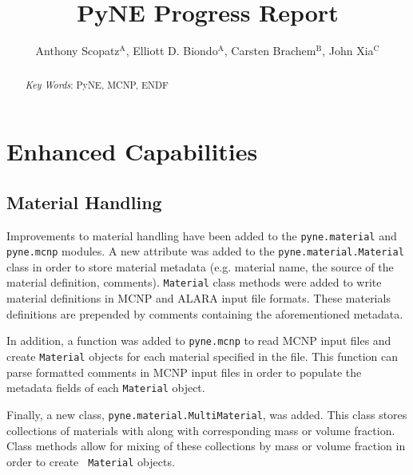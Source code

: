 \documentclass{ansconf}
\newcommand{\superscript}[1]{\ensuremath{^{\textrm{#1}}}}
\begin{document}
\title{PyNE Progress Report}

\author{Anthony Scopatz\superscript{A}, Elliott D. Biondo\superscript{A}, 
        Carsten Brachem\superscript{B}, John Xia\superscript{C}}

\maketitle

\begin{abstract}
\raggedright

\emph{Key Words}: PyNE, MCNP, ENDF
\end{abstract}

\setlength{\baselineskip}{12pt}


\section{Enhanced Capabilities}

\subsection{Material Handling}

Improvements to material handling have been added to the \texttt{pyne.material}
and \texttt{pyne.mcnp} modules. A new attribute was added to the
\texttt{pyne.material.Material} class in order to store material metadata (e.g.
material name, the source of the material definition, comments).
\texttt{Material} class methods were added to write material definitions in MCNP
and ALARA \cite{wilson_alara:_1999} input file formats.  These materials
definitions are prepended by comments containing the aforementioned metadata. 

In addition, a function was added to \texttt{pyne.mcnp} to read MCNP input files and
create \texttt{Material} objects for each material specified in the file. This
function can parse formatted comments in MCNP input files in order to
populate the metadata fields of each \texttt{Material} object.

Finally, a new class, \texttt{pyne.material.MultiMaterial}, was added.  This
class stores collections of materials with along with corresponding mass or
volume fraction.  Class methods allow for mixing of these collections by mass
or volume fraction in order to create \texttt{ Material} objects.
\end{document}
